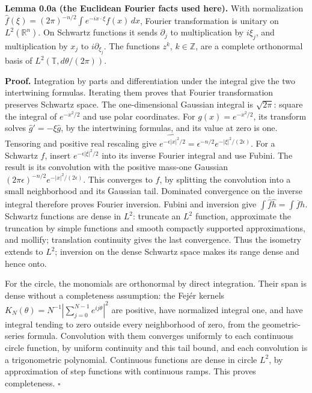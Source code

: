 \documentclass[
  11pt,
]{article}
\begin{document}
\textbf{Lemma 0.0a (the Euclidean Fourier facts used here).} With
normalization
\(\widehat f(\xi)=(2\pi)^{-n/2}\int e^{-ix\cdot\xi}f(x)\,dx\), Fourier
transformation is unitary on \(L^2(\mathbb R^n)\). On Schwartz functions
it sends \(\partial_j\) to multiplication by \(i\xi_j\), and
multiplication by \(x_j\) to \(i\partial_{\xi_j}\). The functions
\(z^k\), \(k\in\mathbb Z\), are a complete orthonormal basis of
\(L^2(\mathbb T,d\theta/(2\pi))\).

\textbf{Proof.} Integration by parts and differentiation under the
integral give the two intertwining formulas. Iterating them proves that
Fourier transformation preserves Schwartz space. The one-dimensional
Gaussian integral is \(\sqrt{2\pi}\): square the integral of
\(e^{-x^2/2}\) and use polar coordinates. For \(g(x)=e^{-x^2/2}\), its
transform solves \(\widehat g'=-\xi\widehat g\), by the intertwining
formulas, and its value at zero is one. Tensoring and positive real
rescaling give
\(\widehat {e^{-\epsilon|x|^2/2}}=\epsilon^{-n/2}e^{-|\xi|^2/(2\epsilon)}\).
For a Schwartz \(f\), insert \(e^{-\epsilon|\xi|^2/2}\) into its inverse
Fourier integral and use Fubini. The result is its convolution with the
positive mass-one Gaussian
\((2\pi\epsilon)^{-n/2}e^{-|x|^2/(2\epsilon)}\). This converges to
\(f\), by splitting the convolution into a small neighborhood and its
Gaussian tail. Dominated convergence on the inverse integral therefore
proves Fourier inversion. Fubini and inversion give
\(\int\overline{\widehat f}\widehat h=\int\overline f h\). Schwartz
functions are dense in \(L^2\): truncate an \(L^2\) function,
approximate the truncation by simple functions and smooth compactly
supported approximations, and mollify; translation continuity gives the
last convergence. Thus the isometry extends to \(L^2\); inversion on the
dense Schwartz space makes its range dense and hence onto.

For the circle, the monomials are orthonormal by direct integration.
Their span is dense without a completeness assumption: the Fejér kernels
\(K_N(\theta)=N^{-1}|\sum_{j=0}^{N-1}e^{ij\theta}|^2\) are positive,
have normalized integral one, and have integral tending to zero outside
every neighborhood of zero, from the geometric-series formula.
Convolution with them converges uniformly to each continuous circle
function, by uniform continuity and this tail bound, and each
convolution is a trigonometric polynomial. Continuous functions are
dense in circle \(L^2\), by approximation of step functions with
continuous ramps. This proves completeness. \(\square\)
\end{document}
